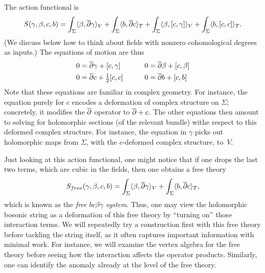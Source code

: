 The action functional is
\begin{equation}\label{bosaction}
S(\gamma,\beta,c,b) = 
\int_\Sigma \langle \beta, \overline{\partial} \gamma \rangle_V 
+ \int_\Sigma \langle b, \overline{\partial} c \rangle_T 
+ \int_\Sigma \langle \beta, [c,\gamma] \rangle_V 
+ \int_\Sigma \langle b, [c,c] \rangle_T.
\end{equation}
(We discuss below how to think about fields with nonzero cohomological degrees as inputs.)
The equations of motion are thus
\begin{alignat*}{2}
0 &= \overline{\partial} \gamma + [c,\gamma] & \quad\quad  0 &= \overline{\partial} \beta + [c,\beta] \\
0  &= \overline{\partial} c + \tfrac{1}{2} [c,c] & \quad\quad  0 &= \overline{\partial} b + [c,b] 
\end{alignat*}
Note that these equations are familiar in complex geometry.
For instance, the equation purely for $c$ encodes a deformation of complex structure on $\Sigma$; concretely, it modifies the $\overline{\partial}$ operator to $\overline{\partial} + c$.
The other equations then amount to solving for holomorphic sections (of the relevant bundle) withe respect to this deformed complex structure.
For instance, the equation in $\gamma$ picks out holomorphic maps from $\Sigma$,
with the $c$-deformed complex structure, to~$V$.



\begin{rmk}
\label{rmk:bcbg}
Just looking at this action functional, one might notice that if one drops the last two terms,
which are cubic in the fields, then one obtains a free theory
\begin{equation}
S_{free}(\gamma,\beta,c,b) = 
\int_\Sigma \langle \beta, \overline{\partial} \gamma \rangle_V 
+ \int_\Sigma \langle b, \overline{\partial} c \rangle_T,
\end{equation}
which is known as the {\em free $bc\beta\gamma$ system}.
Thus, one may view the holomorphic bosonic string as a deformation of this free theory
by ``turning on'' those interaction terms.
We will repeatedly try a construction first with this free theory before tackling the string itself,
as it often captures important information with minimal work.
For instance, we will examine the vertex algebra for the free theory before seeing how the interaction affects the operator products.
Similarly, one can identify the anomaly already at the level of the free theory.
\end{rmk}

